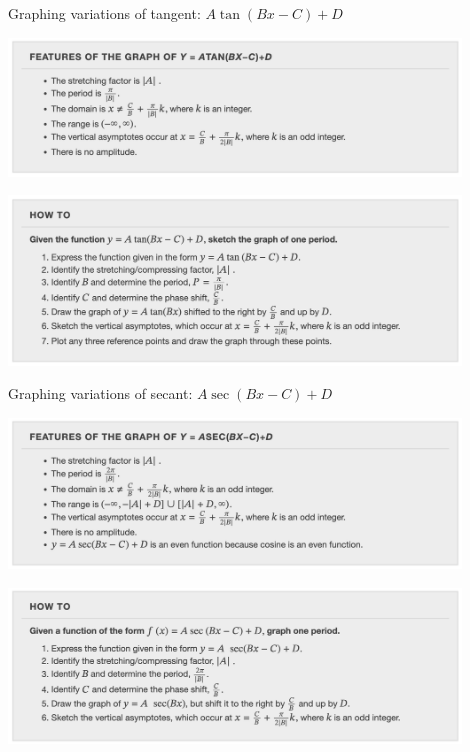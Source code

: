 \documentclass[presentation,10pt]{beamer}
\begin{document}
\begin{frame}[label={sec:orgdc97da2}]{Graphing variations of tangent: \(A \tan (Bx - C) + D\)}
\begin{center}
\includegraphics[width=0.9\textwidth]{./tanFeat.png}
\end{center}


\begin{center}
\includegraphics[width=0.9\textwidth]{./howToTan.png}
\end{center}
\end{frame}


\begin{frame}[label={sec:orgeaec6f9}]{Graphing variations of secant: \(A \sec (Bx - C) + D\)}
\begin{center}
\includegraphics[width=0.9\textwidth]{./secFeat.png}
\end{center}

\begin{center}
\includegraphics[width=0.9\textwidth]{./howToSec.png}
\end{center}
\end{frame}
\end{document}
